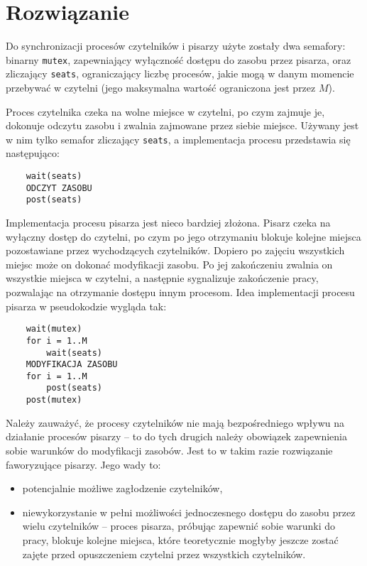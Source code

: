 \documentclass{article}
\begin{document}
\section{Rozwiązanie}

Do synchronizacji procesów czytelników i pisarzy użyte zostały dwa semafory: binarny \texttt{mutex}, zapewniający wyłączność dostępu do zasobu przez pisarza, oraz zliczający \texttt{seats}, ograniczający liczbę procesów, jakie mogą w danym momencie przebywać w czytelni (jego maksymalna wartość ograniczona jest przez $M$).

Proces czytelnika czeka na wolne miejsce w czytelni, po czym zajmuje je, dokonuje odczytu zasobu i zwalnia zajmowane przez siebie miejsce. Używany jest w nim tylko semafor zliczający \texttt{seats}, a implementacja procesu przedstawia się następująco:

\begin{verbatim}
    wait(seats)
    ODCZYT ZASOBU
    post(seats)
\end{verbatim}

Implementacja procesu pisarza jest nieco bardziej złożona. Pisarz czeka na wyłączny dostęp do czytelni, po czym po jego otrzymaniu blokuje kolejne miejsca pozostawiane przez wychodzących czytelników. Dopiero po zajęciu wszystkich miejsc może on dokonać modyfikacji zasobu. Po jej zakończeniu zwalnia on wszystkie miejsca w czytelni, a następnie sygnalizuje zakończenie pracy, pozwalając na otrzymanie dostępu innym procesom. Idea implementacji procesu pisarza w pseudokodzie wygląda tak:

\begin{verbatim}
    wait(mutex)
    for i = 1..M
        wait(seats)
    MODYFIKACJA ZASOBU
    for i = 1..M
        post(seats)
    post(mutex)
\end{verbatim}

Należy zauważyć, że procesy czytelników nie mają bezpośredniego wpływu na działanie procesów pisarzy -- to do tych drugich należy obowiązek zapewnienia sobie warunków do modyfikacji zasobów. Jest to w takim razie rozwiązanie faworyzujące pisarzy. Jego wady to:

\begin{itemize}
    \item potencjalnie możliwe zagłodzenie czytelników,
    \item niewykorzystanie w pełni możliwości jednoczesnego dostępu do zasobu przez wielu czytelników -- proces pisarza, próbując zapewnić sobie warunki do pracy, blokuje kolejne miejsca, które teoretycznie mogłyby jeszcze zostać zajęte przed opuszczeniem czytelni przez wszystkich czytelników.
\end{itemize}
\end{document}
